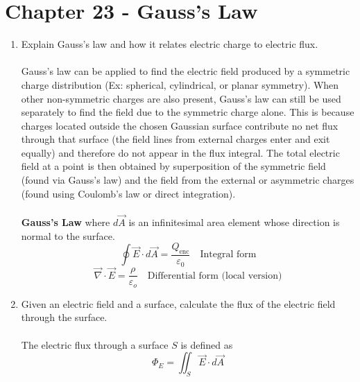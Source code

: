 \documentclass[12pt]{article}
\begin{document}
\section*{Chapter 23 - Gauss's Law}
\begin{enumerate}
    \item Explain Gauss's law and how it relates electric charge to electric flux.\\\\
Gauss’s law can be applied to find the electric field produced by a symmetric charge distribution (Ex: spherical, cylindrical, or planar symmetry). When other non-symmetric charges are also present, Gauss’s law can still be used separately to find the field due to the symmetric charge alone.
This is because charges located outside the chosen Gaussian surface contribute no net flux through that surface (the field lines from external charges enter and exit equally) and therefore do not appear in the flux integral.
The total electric field at a point is then obtained by superposition of the symmetric field (found via Gauss’s law) and the field from the external or asymmetric charges (found using Coulomb’s law or direct integration).\\\\
\textbf{Gauss's Law}
where $d\vec{A}$ is an infinitesimal area element whose direction is normal to the surface.
\[\boxed{\oint \vec{E} \cdot d\vec{A} = \frac{Q_{\text{enc}}}{\varepsilon_0} \quad \text{Integral form}}\]
\[\boxed{\vec{\nabla} \cdot \vec{E} = \frac{\rho}{\varepsilon_o} \quad \text{Differential form (local version)}}\]
    \item Given an electric field and a surface, calculate the flux of the electric field through the surface.\\\\
The electric flux through a surface $S$ is defined as
\[\Phi_E = \iint_S \vec{E} \cdot d\vec{A}\]



\end{enumerate}
\end{document}
